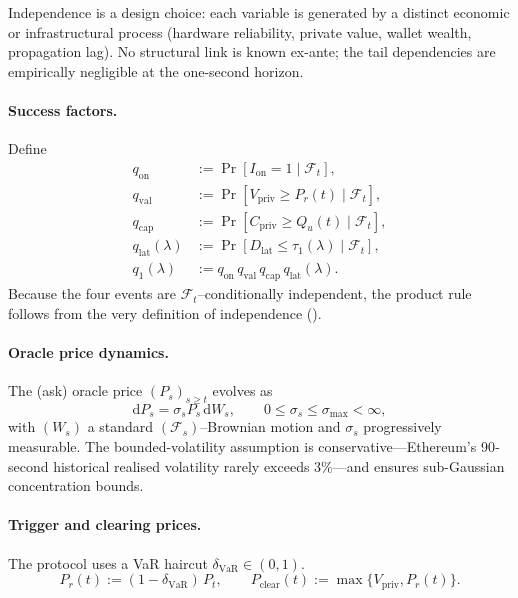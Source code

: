 \documentclass[11pt]{article}
\begin{document}
Independence is a design choice:  
each variable is generated by a distinct economic or infrastructural
process (hardware reliability, private value, wallet wealth,
propagation lag).  No structural link is known ex-ante; the tail
dependencies are empirically negligible at the one-second horizon.

\paragraph{Success factors.}
Define
\[
\begin{aligned}
q_{\mathrm{on}}
    &:= \Pr[I_{\mathrm{on}}=1\mid\mathcal F_t],\\
q_{\mathrm{val}}
    &:= \Pr[V_{\mathrm{priv}}\ge P_r(t)\mid\mathcal F_t],\\
q_{\mathrm{cap}}
    &:= \Pr[C_{\mathrm{priv}}\ge Q_u(t)\mid\mathcal F_t],\\
q_{\mathrm{lat}}(\lambda)
    &:= \Pr[D_{\mathrm{lat}}\le\tau_1(\lambda)\mid\mathcal F_t],\\
q_1(\lambda)
    &:= q_{\mathrm{on}}\,
        q_{\mathrm{val}}\,
        q_{\mathrm{cap}}\,
        q_{\mathrm{lat}}(\lambda).
\end{aligned}
\]
Because the four events are $\mathcal F_t$–conditionally independent,
the product rule follows from the very
definition of independence (\textcite[Def.\ 9.1]{williams1991}).

\paragraph{Oracle price dynamics.}
The (ask) oracle price $(P_s)_{s\ge t}$ evolves as
\[
   \mathrm dP_s
      = \sigma_s P_s \,\mathrm dW_s,
   \qquad
   0\le\sigma_s\le\sigma_{\max}<\infty,
\]
with $(W_s)$ a standard $(\mathcal F_s)$–Brownian motion and
$\sigma_s$ progressively measurable.  The bounded-volatility
assumption is conservative—Ethereum’s 90‐second historical realised
volatility rarely exceeds $3\%$—and ensures sub-Gaussian concentration
bounds.

\paragraph{Trigger and clearing prices.}
The protocol uses a VaR haircut $\delta_{\mathrm{VaR}}\in(0,1)$.
\[
   P_r(t)
      := (1-\delta_{\mathrm{VaR}})\,P_t,
   \qquad
   P_{\mathrm{clear}}(t)
      := \max\{V_{\mathrm{priv}}, P_r(t)\}.
\]
\end{document}
